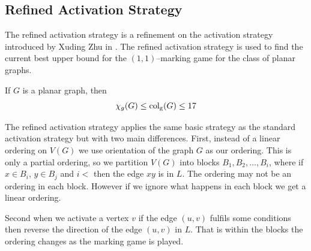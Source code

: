 \subsection{Refined Activation Strategy}\label{sec:refActStrat}
The refined activation strategy is a refinement on the activation strategy introduced by Xuding Zhu in \cite{Zhu2008}. The refined activation strategy is used to find the current best upper bound for the $(1,1)$--marking game for the class of planar graphs. 

\begin{theorem}
    If $G$ is a planar graph, then \[\chi_g(G)\leq\operatorname{col_g}(G)\leq17\]
\end{theorem}

The refined activation strategy applies the same basic strategy as the standard activation strategy but with two main differences. First, instead of a linear ordering on $V(G)$ we use orientation of the graph $G$ as our ordering. This is only a partial ordering, so we partition $V(G)$ into blocks $B_1,B_2,\dots,B_i$, where if $x \in B_i$, $y \in B_j$ and $i <$ then the edge $xy$ is in $L$. The ordering may not be an ordering in each block. However if we ignore what happens in each block we get a linear ordering.

Second when we activate a vertex $v$ if the edge $(u,v)$ fulfils some conditions then reverse the direction of the edge $(u,v)$ in $L$. That is within the blocks the ordering changes as the marking game is played.

%
%
%
%


















